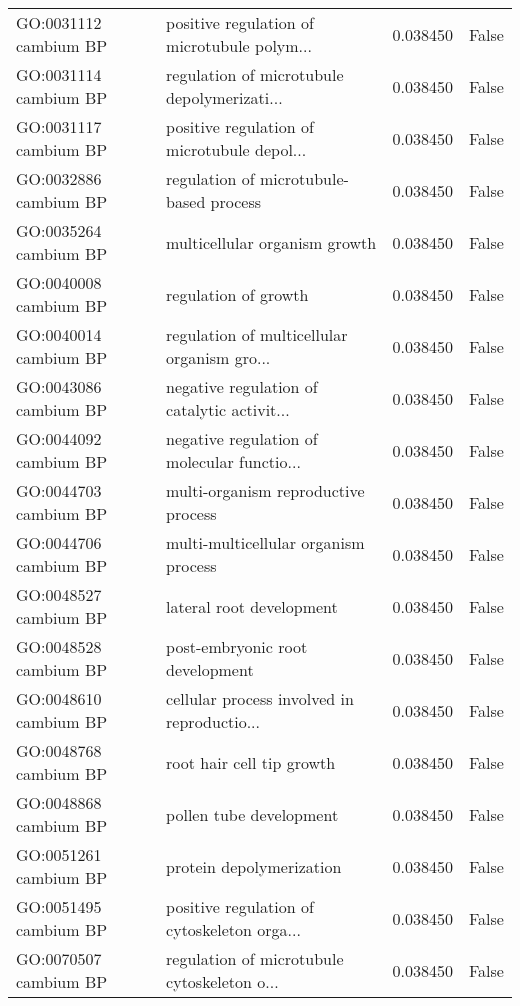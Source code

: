 \begin{tabular}{llrl}
GO:0031112 cambium BP       &  positive regulation of microtubule polym... &       0.038450 &  False \\
GO:0031114 cambium BP       &  regulation of microtubule depolymerizati... &       0.038450 &  False \\
GO:0031117 cambium BP       &  positive regulation of microtubule depol... &       0.038450 &  False \\
GO:0032886 cambium BP       &      regulation of microtubule-based process &       0.038450 &  False \\
GO:0035264 cambium BP       &                multicellular organism growth &       0.038450 &  False \\
GO:0040008 cambium BP       &                         regulation of growth &       0.038450 &  False \\
GO:0040014 cambium BP       &  regulation of multicellular organism gro... &       0.038450 &  False \\
GO:0043086 cambium BP       &  negative regulation of catalytic activit... &       0.038450 &  False \\
GO:0044092 cambium BP       &  negative regulation of molecular functio... &       0.038450 &  False \\
GO:0044703 cambium BP       &          multi-organism reproductive process &       0.038450 &  False \\
GO:0044706 cambium BP       &         multi-multicellular organism process &       0.038450 &  False \\
GO:0048527 cambium BP       &                     lateral root development &       0.038450 &  False \\
GO:0048528 cambium BP       &              post-embryonic root development &       0.038450 &  False \\
GO:0048610 cambium BP       &  cellular process involved in reproductio... &       0.038450 &  False \\
GO:0048768 cambium BP       &                    root hair cell tip growth &       0.038450 &  False \\
GO:0048868 cambium BP       &                      pollen tube development &       0.038450 &  False \\
GO:0051261 cambium BP       &                     protein depolymerization &       0.038450 &  False \\
GO:0051495 cambium BP       &  positive regulation of cytoskeleton orga... &       0.038450 &  False \\
GO:0070507 cambium BP       &  regulation of microtubule cytoskeleton o... &       0.038450 &  False \\

\end{tabular}
